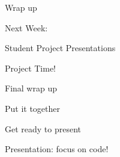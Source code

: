 \documentclass{beamer}
\begin{document}
\begin{frame}[fragile]{Wrap up}

\vfill
{\Large }
\vfill

\end{frame}

\begin{frame}{Next Week:}

\vfill
{\LARGE Student Project Presentations}

\vfill

\end{frame}

\begin{frame}[fragile]{Project Time!}

\vfill
\Large{Final wrap up}

\vfill
\Large{Put it together}

\vfill
\Large{Get ready to present}

\vfill
\Large{Presentation: focus on code!}

\end{frame}
\end{document}
